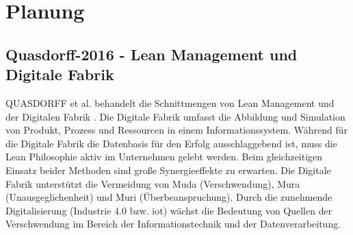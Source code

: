 % 
%  
%  
%  
 
\section{Planung}
\subsection*{Quasdorff-2016 - Lean Management und Digitale Fabrik}

QUASDORFF et al. behandelt die Schnittmengen von Lean Management und der Digitalen Fabrik \autocite{Quasdorff2016}. 
%
Die Digitale Fabrik umfasst die Abbildung und Simulation von Produkt, Prozess und Ressourcen in einem Informationssystem. Während für die Digitale Fabrik die Datenbasis für den Erfolg ausschlaggebend ist, muss die Lean Philosophie aktiv im Unternehmen gelebt werden. Beim gleichzeitigen Einsatz beider Methoden sind große Synergieeffekte zu erwarten. 
%
Die Digitale Fabrik unterstützt die Vermeidung von Muda (Verschwendung), Mura (Unausgeglichenheit) und Muri (Überbeanspruchung). Durch die zunehmende Digitalisierung (Industrie 4.0 bzw. \gls{iot}) wächst die Bedeutung von Quellen der Verschwendung im Bereich der Informationstechnik und der Datenverarbeitung. 

